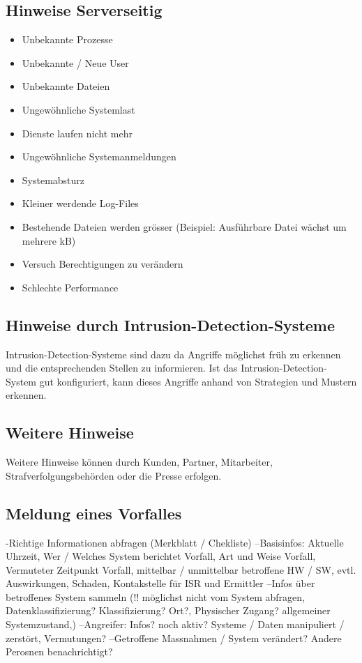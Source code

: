 \subsection{Hinweise Serverseitig}
\begin{itemize}
  \item Unbekannte Prozesse
  \item Unbekannte / Neue User
  \item Unbekannte Dateien
  \item Ungewöhnliche Systemlast
  \item Dienste laufen nicht mehr
  \item Ungewöhnliche Systemanmeldungen
  \item Systemabsturz
  \item Kleiner werdende Log-Files
  \item Bestehende Dateien werden grösser (Beispiel: Ausführbare Datei wächst um mehrere kB)
  \item Versuch Berechtigungen zu verändern
  \item Schlechte Performance
\end{itemize}

\subsection{Hinweise durch Intrusion-Detection-Systeme}
Intrusion-Detection-Systeme sind dazu da Angriffe möglichst früh zu erkennen und die entsprechenden Stellen zu informieren. Ist das Intrusion-Detection-System gut konfiguriert, kann dieses Angriffe anhand von Strategien und Mustern erkennen.



\subsection{Weitere Hinweise}
Weitere Hinweise können durch Kunden, Partner, Mitarbeiter, Strafverfolgungsbehörden oder die Presse erfolgen.

\subsection{Meldung eines Vorfalles}

-Richtige Informationen abfragen (Merkblatt / Chekliste)
--Basisinfos: Aktuelle Uhrzeit, Wer / Welches System berichtet Vorfall, Art und Weise Vorfall, Vermuteter Zeitpunkt Vorfall, mittelbar / unmittelbar betroffene HW / SW, evtl. Auswirkungen, Schaden, Kontakstelle für ISR und Ermittler
--Infos über betroffenes System sammeln (!! möglichst nicht vom System abfragen, Datenklassifizierung? Klassifizierung? Ort?, Physischer Zugang?  allgemeiner Systemzustand,)
--Angreifer: Infos? noch aktiv? Systeme / Daten manipuliert / zerstört, Vermutungen?
--Getroffene Massnahmen / System verändert? Andere Perosnen benachrichtigt?

